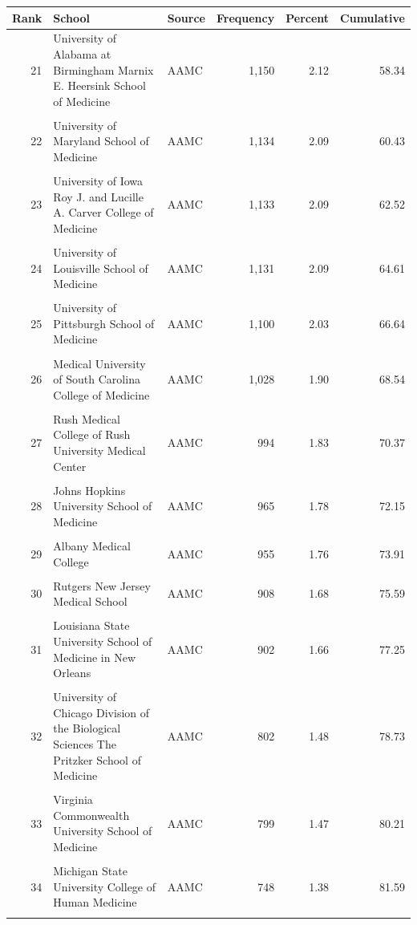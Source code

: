 \begin{tabular}{r p{} l r r r}
\toprule
Rank & School & Source & Frequency & Percent & Cumulative \\ \midrule
21 & University of Alabama at Birmingham Marnix E. Heersink School of Medicine & AAMC & 1,150 & 2.12 & 58.34 \\\\
22 & University of Maryland School of Medicine & AAMC & 1,134 & 2.09 & 60.43 \\\\
23 & University of Iowa Roy J. and Lucille A. Carver College of Medicine & AAMC & 1,133 & 2.09 & 62.52 \\\\
24 & University of Louisville School of Medicine & AAMC & 1,131 & 2.09 & 64.61 \\\\
25 & University of Pittsburgh School of Medicine & AAMC & 1,100 & 2.03 & 66.64 \\\\
26 & Medical University of South Carolina College of Medicine & AAMC & 1,028 & 1.90 & 68.54 \\\\
27 & Rush Medical College of Rush University Medical Center & AAMC & 994 & 1.83 & 70.37 \\\\
28 & Johns Hopkins University School of Medicine & AAMC & 965 & 1.78 & 72.15 \\\\
29 & Albany Medical College & AAMC & 955 & 1.76 & 73.91 \\\\
30 & Rutgers New Jersey Medical School & AAMC & 908 & 1.68 & 75.59 \\\\
31 & Louisiana State University School of Medicine in New Orleans & AAMC & 902 & 1.66 & 77.25 \\\\
32 & University of Chicago Division of the Biological Sciences The Pritzker School of Medicine & AAMC & 802 & 1.48 & 78.73 \\\\
33 & Virginia Commonwealth University School of Medicine & AAMC & 799 & 1.47 & 80.21 \\\\
34 & Michigan State University College of Human Medicine & AAMC & 748 & 1.38 & 81.59 \\\\

\end{tabular}
